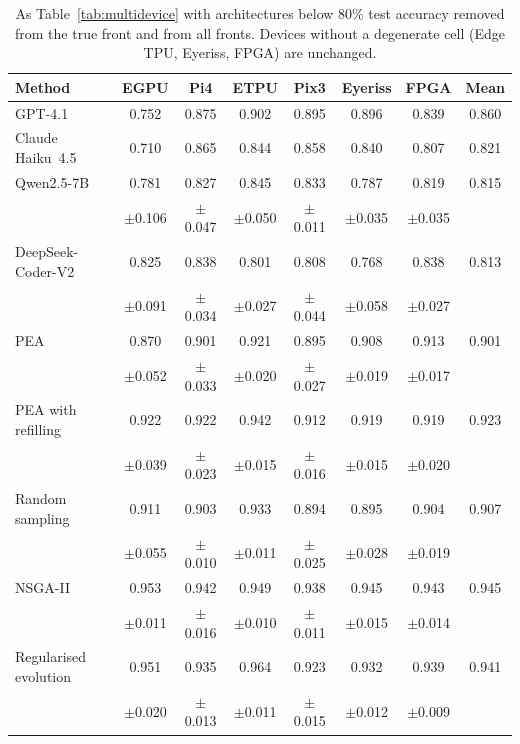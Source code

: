 \documentclass[pdflatex,sn-mathphys-num]{sn-jnl}
\begin{document}
\begin{table}[h]\centering\footnotesize
\caption{As Table~\ref{tab:multidevice} with architectures below 80\% test accuracy removed from the true front and from all fronts. Devices without a degenerate cell (Edge TPU, Eyeriss, FPGA) are unchanged.}\label{tab:multidevicefloor}
\setlength{\tabcolsep}{2pt}
\begin{tabular}{lccccccc}
\toprule
Method & EGPU & Pi4 & ETPU & Pix3 & Eyeriss & FPGA & Mean \\
\midrule
GPT-4.1 & 0.752 & 0.875 & 0.902 & 0.895 & 0.896 & 0.839 & 0.860 \\
Claude Haiku~4.5 & 0.710 & 0.865 & 0.844 & 0.858 & 0.840 & 0.807 & 0.821 \\
Qwen2.5-7B & 0.781 & 0.827 & 0.845 & 0.833 & 0.787 & 0.819 & 0.815 \\
 & $\pm$0.106 & $\pm$0.047 & $\pm$0.050 & $\pm$0.011 & $\pm$0.035 & $\pm$0.035 &  \\
DeepSeek-Coder-V2 & 0.825 & 0.838 & 0.801 & 0.808 & 0.768 & 0.838 & 0.813 \\
 & $\pm$0.091 & $\pm$0.034 & $\pm$0.027 & $\pm$0.044 & $\pm$0.058 & $\pm$0.027 &  \\
\midrule
PEA & 0.870 & 0.901 & 0.921 & 0.895 & 0.908 & 0.913 & 0.901 \\
 & $\pm$0.052 & $\pm$0.033 & $\pm$0.020 & $\pm$0.027 & $\pm$0.019 & $\pm$0.017 &  \\
PEA with refilling & 0.922 & 0.922 & 0.942 & 0.912 & 0.919 & 0.919 & 0.923 \\
 & $\pm$0.039 & $\pm$0.023 & $\pm$0.015 & $\pm$0.016 & $\pm$0.015 & $\pm$0.020 &  \\
Random sampling & 0.911 & 0.903 & 0.933 & 0.894 & 0.895 & 0.904 & 0.907 \\
 & $\pm$0.055 & $\pm$0.010 & $\pm$0.011 & $\pm$0.025 & $\pm$0.028 & $\pm$0.019 &  \\
NSGA-II & 0.953 & 0.942 & 0.949 & 0.938 & 0.945 & 0.943 & 0.945 \\
 & $\pm$0.011 & $\pm$0.016 & $\pm$0.010 & $\pm$0.011 & $\pm$0.015 & $\pm$0.014 &  \\
Regularised evolution & 0.951 & 0.935 & 0.964 & 0.923 & 0.932 & 0.939 & 0.941 \\
 & $\pm$0.020 & $\pm$0.013 & $\pm$0.011 & $\pm$0.015 & $\pm$0.012 & $\pm$0.009 &  \\
\bottomrule
\end{tabular}
\end{table}
\end{document}
